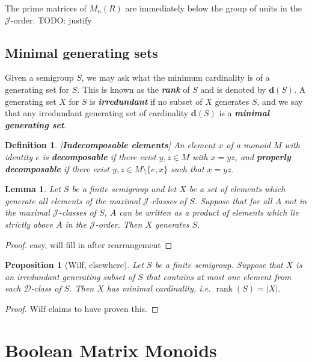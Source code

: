 \documentclass[11pt]{article}
\newtheorem{prop}[thm]{Proposition}
\newtheorem{lemma}[thm]{Lemma}
\newtheorem*{defi}{Definition}
\newenvironment{de}{\begin{defi}\rm}{\end{defi}}
\newcommand{\defn}[1]{\textbf{\textit{#1}}}
\numberwithin{equation}{section}
\newcommand{\D}{\mathscr{D}}
\newcommand{\J}{\mathscr{J}}
\newcommand{\rank}{\operatorname{rank}}
\begin{document}
The prime matrices of $M_n(R)$ are immediately below the group of units in the
$\J$-order. TODO: justify 


\subsection{Minimal generating sets}

Given a semigroup $S$, we may ask what the minimum cardinality is of a
generating set for $S$. This is known as the \defn{rank} of $S$ and is denoted
by $\mathbf{d}(S)$. A generating set $X$ for $S$ is \defn{irredundant} if no
subset of $X$ generates $S$, and we say that any irredundant generating set of
cardinality $\mathbf{d}(S)$ is a \defn{minimal generating set}.

\begin{de}[\textbf{Indecomposable elements}]
  An element $x$ of a monoid $M$ with identity $e$ is \defn{decomposable} if
  there exist $y, z \in M$ with $x = yz$, and \defn{properly decomposable} if
  there exist $y, z \in M\setminus\{e, x\}$ such that $x = yz$.
\end{de}

\begin{lemma}
  Let $S$ be a finite semigroup and let $X$ be a set of elements which generate
  all elements of the maximal $\J$-classes of $S$. Suppose that for all $A$ not
  in the maximal $\J$-classes of $S$, $A$ can be written as a product of
  elements which lie strictly above $A$ in the $\J$-order. Then $X$ generates
  $S$. 
\end{lemma}
\begin{proof}
  easy, will fill in after rearrangement
\end{proof}

\begin{prop}[Wilf, elsewhere]
  Let $S$ be a finite semigroup.  Suppose that $X$ is an irredundant generating
  subset of $S$ that contains at most one element from each $\D$-class of $S$.
  Then $X$ has minimal cardinality, i.e. $\rank(S) = |X|$.
\end{prop}
\begin{proof}
  Wilf claims to have proven this.
\end{proof}



\section{Boolean Matrix Monoids}
\label{sec:boolmat}
\end{document}
